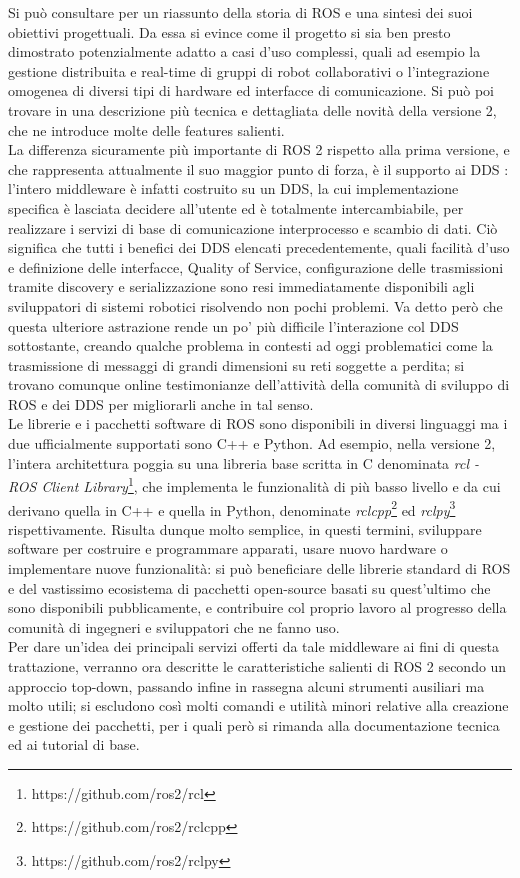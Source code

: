 Si può consultare \cite{why_ros2} per un riassunto della storia di ROS e una sintesi dei suoi obiettivi progettuali. Da essa si evince come il progetto si sia ben presto dimostrato potenzialmente adatto a casi d'uso complessi, quali ad esempio la gestione distribuita e real-time di gruppi di robot collaborativi o l'integrazione omogenea di diversi tipi di hardware ed interfacce di comunicazione. Si può poi trovare in \cite{ros2_changes} una descrizione più tecnica e dettagliata delle novità della versione 2, che ne introduce molte delle features salienti.\\
La differenza sicuramente più importante di ROS 2 rispetto alla prima versione, e che rappresenta attualmente il suo maggior punto di forza, è il supporto ai DDS \cite{ros2_dds}: l’intero middleware è infatti costruito su un DDS, la cui implementazione specifica è lasciata decidere all’utente ed è totalmente intercambiabile, per realizzare i servizi di base di comunicazione interprocesso e scambio di dati. Ciò significa che tutti i benefici dei DDS elencati precedentemente, quali facilità d'uso e definizione delle interfacce, Quality of Service, configurazione delle trasmissioni tramite discovery e serializzazione sono resi immediatamente disponibili agli sviluppatori di sistemi robotici risolvendo non pochi problemi. Va detto però che questa ulteriore astrazione rende un po' più difficile l'interazione col DDS sottostante, creando qualche problema in contesti ad oggi problematici come la trasmissione di messaggi di grandi dimensioni su reti soggette a perdita; si trovano comunque online testimonianze dell'attività della comunità di sviluppo di ROS e dei DDS per migliorarli anche in tal senso.\\
Le librerie e i pacchetti software di ROS sono disponibili in diversi linguaggi ma i due ufficialmente supportati sono C++ e Python. Ad esempio, nella versione 2, l'intera architettura poggia su una libreria base scritta in C denominata \emph{rcl - ROS Client Library}\footnote{https://github.com/ros2/rcl}, che implementa le funzionalità di più basso livello e da cui derivano quella in C++ e quella in Python, denominate \emph{rclcpp}\footnote{https://github.com/ros2/rclcpp} ed \emph{rclpy}\footnote{https://github.com/ros2/rclpy} rispettivamente. Risulta dunque molto semplice, in questi termini, sviluppare software per costruire e programmare apparati, usare nuovo hardware o implementare nuove funzionalità: si può beneficiare delle librerie standard di ROS e del vastissimo ecosistema di pacchetti open-source basati su quest'ultimo che sono disponibili pubblicamente, e contribuire col proprio lavoro al progresso della comunità di ingegneri e sviluppatori che ne fanno uso.\\
Per dare un'idea dei principali servizi offerti da tale middleware ai fini di questa trattazione, verranno ora descritte le caratteristiche salienti di ROS 2 secondo un approccio top-down, passando infine in rassegna alcuni strumenti ausiliari ma molto utili; si escludono così molti comandi e utilità minori relative alla creazione e gestione dei pacchetti, per i quali però si rimanda alla documentazione tecnica ed ai tutorial di base.\vfill\newpage

